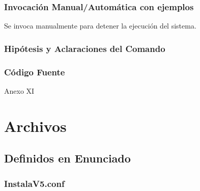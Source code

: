 \documentclass[a4paper,10pt,titlepage]{article}
\begin{document}
		\subsubsection{Invocaci\'on Manual/Autom\'atica con ejemplos}
			Se invoca manualmente para detener la ejecuci\'on del sistema.

		\subsubsection{Hip\'otesis y Aclaraciones del Comando}

		\subsubsection{C\'odigo Fuente}
			Anexo XI

\section{Archivos}

	\subsection{Definidos en Enunciado}
		
		\subsubsection{InstalaV5.conf}
\end{document}
